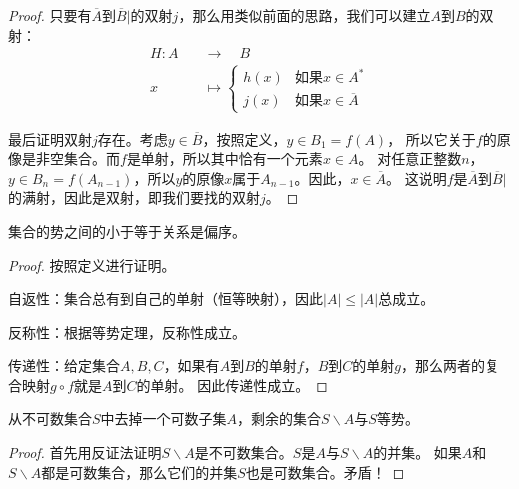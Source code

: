 \documentclass[12pt,UTF8,fontset=none]{ctexbook}
\begin{document}
\begin{appendix}
\begin{proof}
    只要有$\overline{A}$到$\overline{B}|$的双射$j$，那么用类似前面的思路，我们可以建立$A$到$B$的双射：
    \begin{align*}
        H : A \quad&\rightarrow \quad B  \\
        x \quad&\mapsto \left\{ \begin{array}{ll}
            h(x) & \mbox{如果} x\in A^*  \\
            j(x) & \mbox{如果} x\in \overline{A}
        \end{array} \right.
    \end{align*}

    最后证明双射$j$存在。考虑$y \in \overline{B}$，按照定义，$y\in B_1 = f(A)$，
    所以它关于$f$的原像是非空集合。而$f$是单射，所以其中恰有一个元素$x\in A$。
    对任意正整数$n$，$y\in B_n = f(A_{n-1})$，所以$y$的原像$x$属于$A_{n-1}$。因此，$x\in \overline{A}$。
    这说明$f$是$\overline{A}$到$\overline{B}|$的满射，因此是双射，即我们要找的双射$j$。

\end{proof}

\begin{tm}
    集合的势之间的小于等于关系是偏序。
\end{tm}

\begin{proof}
    按照定义进行证明。
    
    自返性：集合总有到自己的单射（恒等映射），因此$|A| \leqslant |A|$总成立。

    反称性：根据等势定理，反称性成立。

    传递性：给定集合$A,B,C$，如果有$A$到$B$的单射$f$，$B$到$C$的单射$g$，那么两者的复合映射$g\circ f$就是$A$到$C$的单射。
    因此传递性成立。

\end{proof}

\begin{tm}\label{tm:a-1-15}
    从不可数集合$S$中去掉一个可数子集$A$，剩余的集合$S\backslash A$与$S$等势。
\end{tm}

\begin{proof}
    首先用反证法证明$S\backslash A$是不可数集合。$S$是$A$与$S\backslash A$的并集。
    如果$A$和$S\backslash A$都是可数集合，那么它们的并集$S$也是可数集合。矛盾！


\end{proof}
\end{appendix}
\end{document}
